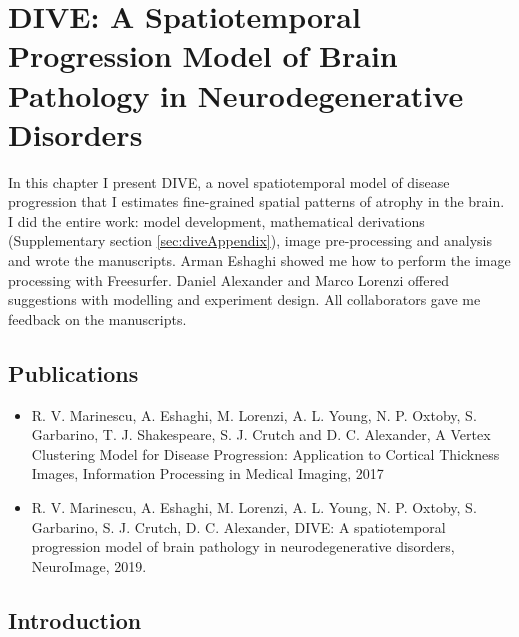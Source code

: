 \chapter[DIVE: A Spatiotemporal Progression Model of Brain Pathology]{DIVE: A Spatiotemporal Progression Model of Brain Pathology in Neurodegenerative Disorders}
\label{chapter:dive}

In this chapter I present DIVE, a novel spatiotemporal model of disease progression that I estimates fine-grained spatial patterns of atrophy in the brain. I did the entire work: model development, mathematical derivations (Supplementary section \ref{sec:diveAppendix}), image pre-processing and analysis and wrote the manuscripts. Arman Eshaghi showed me how to perform the image processing with Freesurfer. Daniel Alexander and Marco Lorenzi offered suggestions with modelling and experiment design. All collaborators gave me feedback on the manuscripts.

\section{Publications}
\begin{itemize}
 \item R. V. Marinescu, A. Eshaghi, M. Lorenzi, A. L. Young, N. P. Oxtoby, S. Garbarino, T. J. Shakespeare, S. J. Crutch and D. C. Alexander, A Vertex Clustering Model for Disease Progression: Application to Cortical Thickness Images, Information Processing in Medical Imaging, 2017
 \item R. V. Marinescu, A. Eshaghi, M. Lorenzi, A. L. Young, N. P. Oxtoby, S. Garbarino, S. J. Crutch, D. C. Alexander, DIVE: A spatiotemporal progression model of brain pathology in neurodegenerative disorders, NeuroImage, 2019.
\end{itemize}


\section{Introduction}
\label{sec:diveInt}

